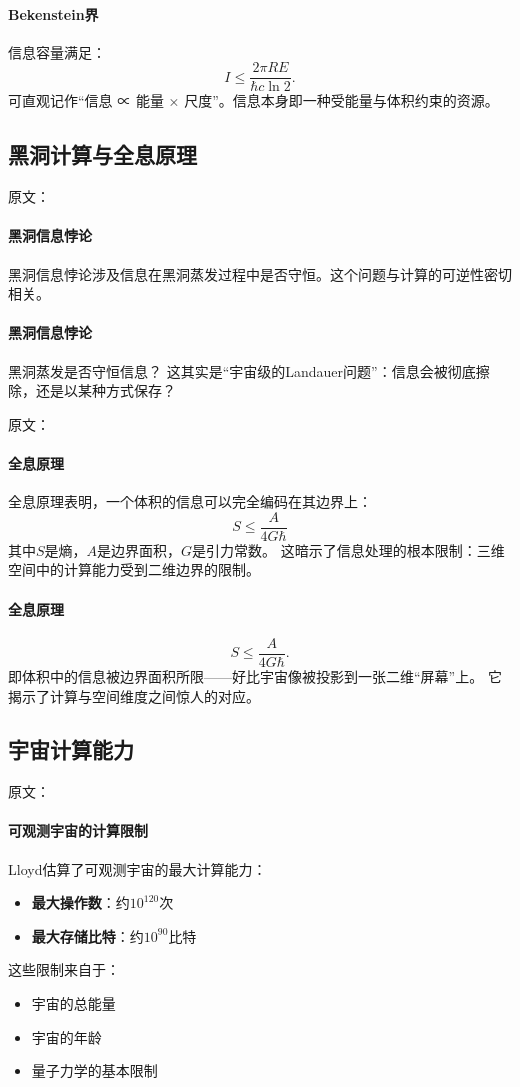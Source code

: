 \paragraph{Bekenstein界}
信息容量满足：
$$I\le\dfrac{2\pi RE}{\hbar c\ln2}.$$
可直观记作“信息 ∝ 能量 × 尺度”。\;信息本身即一种受能量与体积约束的资源。

\subsection{黑洞计算与全息原理}

原文：
\paragraph{黑洞信息悖论}
黑洞信息悖论涉及信息在黑洞蒸发过程中是否守恒。这个问题与计算的可逆性密切相关。
\paragraph{黑洞信息悖论}
黑洞蒸发是否守恒信息？  
这其实是“宇宙级的Landauer问题”：信息会被彻底擦除，还是以某种方式保存？

原文：
\paragraph{全息原理}
全息原理表明，一个体积的信息可以完全编码在其边界上：
$$S \leq \frac{A}{4G\hbar}$$
其中$S$是熵，$A$是边界面积，$G$是引力常数。
这暗示了信息处理的根本限制：三维空间中的计算能力受到二维边界的限制。
\paragraph{全息原理}
$$S\le\dfrac{A}{4G\hbar}.$$
即体积中的信息被边界面积所限——\;好比宇宙像被投影到一张二维“屏幕”上。  
它揭示了计算与空间维度之间惊人的对应。

\subsection{宇宙计算能力}

原文：
\paragraph{可观测宇宙的计算限制}
Lloyd估算了可观测宇宙的最大计算能力：
\begin{itemize}
\item \textbf{最大操作数}：约$10^{120}$次
\item \textbf{最大存储比特}：约$10^{90}$比特
\end{itemize}
这些限制来自于：
\begin{itemize}
\item 宇宙的总能量
\item 宇宙的年龄
\item 量子力学的基本限制
\end{itemize}
